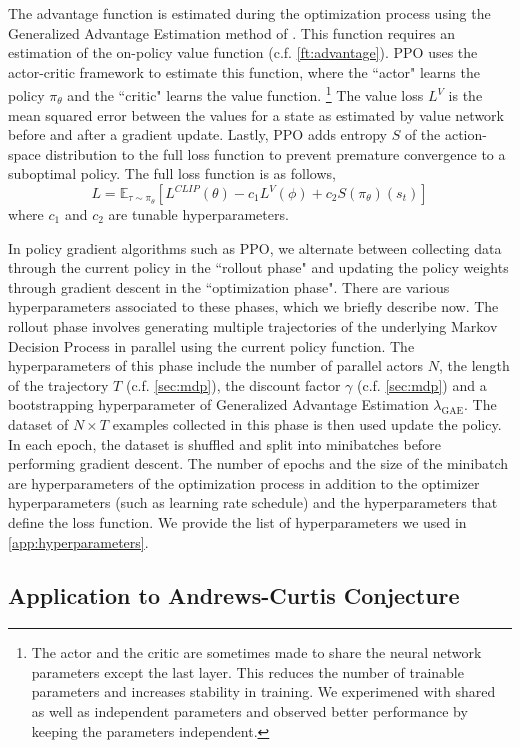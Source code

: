 The advantage function is estimated during the optimization process using the Generalized Advantage Estimation method of 
\cite{schulman2018highdimensional}. 
This function requires an estimation of the on-policy value function (c.f. \autoref{ft:advantage}). PPO uses the actor-critic framework to estimate this function, where the ``actor" learns the policy $\pi_\theta$ and the ``critic" learns the value function.
\footnote{
The actor and the critic are sometimes made to share the neural network parameters except the last layer. This reduces the number of trainable parameters and increases stability in training. We experimened with shared as well as independent parameters and observed better performance by keeping the parameters independent.
}
The value loss $L^V$ is the mean squared error between the values for a state as estimated by value network before and after a gradient update.
Lastly, PPO adds entropy $S$ of the action-space distribution to the full loss function to prevent premature convergence to a suboptimal policy. The full loss function is as follows,
\[
L = \mathbb{E}_{\tau \sim \pi_\theta} [L^{CLIP}(\theta) - c_1 L^{V}(\phi) + c_2 S(\pi_\theta)(s_t)]
\]
where $c_1$ and $c_2$ are tunable hyperparameters.

In policy gradient algorithms such as PPO, we alternate between collecting data through the current policy in the ``rollout phase" and updating the policy weights through gradient descent in the ``optimization phase". There are various hyperparameters associated to these phases, which we briefly describe now. The rollout phase involves generating multiple trajectories of the underlying Markov Decision Process in parallel using the current policy function. The hyperparameters of this phase include the number of parallel actors $N$, the length of the trajectory $T$ (c.f. \autoref{sec:mdp}), the discount factor $\gamma$ (c.f. \autoref{sec:mdp}) and a bootstrapping hyperparameter of Generalized Advantage Estimation $\lambda_{\text{GAE}}$. The dataset of $N \times T$ examples collected in this phase is then used update the policy. In each epoch, the dataset is shuffled and split into minibatches before performing gradient descent. The number of epochs and the size of the minibatch are hyperparameters of the optimization process in addition to the optimizer hyperparameters (such as learning rate schedule) and the hyperparameters that define the loss function. We provide the list of hyperparameters we used in  \autoref{app:hyperparameters}.


\subsection{Application to Andrews-Curtis Conjecture} \label{sec:application}


